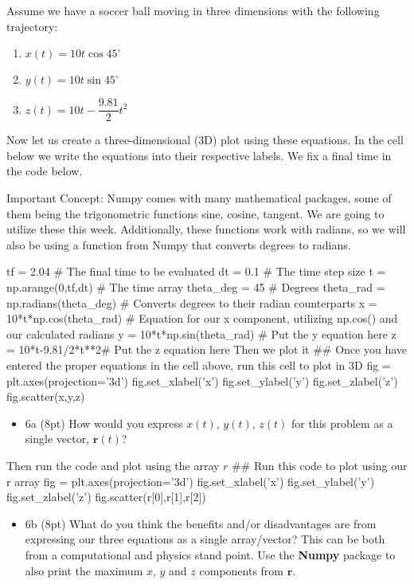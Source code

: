 \documentclass[%
oneside,                 %
final,                   %
10pt]{article}
\begin{document}
Assume we have a soccer ball moving in three dimensions with the following trajectory:

\begin{enumerate}
\item $x(t) = 10t\cos{45^{\circ}} $

\item $y(t) = 10t\sin{45^{\circ}} $

\item $z(t) = 10t - \dfrac{9.81}{2}t^2$
\end{enumerate}

\noindent
Now let us create a three-dimensional (3D) plot using these equations. In the cell below
we write the equations into their respective labels. We fix a final time in the code below.

Important Concept: Numpy comes with many mathematical packages, some
of them being the trigonometric functions sine, cosine, tangent. We
are going to utilize these this week. Additionally, these functions
work with radians, so we will also be using a function from Numpy that
converts degrees to radians.


\bpycod
tf = 2.04  # The final time to be evaluated
dt = 0.1  # The time step size
t = np.arange(0,tf,dt) # The time array
theta_deg = 45 # Degrees
theta_rad = np.radians(theta_deg) # Converts degrees to their radian counterparts
x = 10*t*np.cos(theta_rad) # Equation for our x component, utilizing np.cos() and our calculated radians
y = 10*t*np.sin(theta_rad) # Put the y equation here
z = 10*t-9.81/2*t**2# Put the z equation here
\epycod
Then we plot it
\bpycod
## Once you have entered the proper equations in the cell above, run this cell to plot in 3D
fig = plt.axes(projection='3d')
fig.set_xlabel('x')
fig.set_ylabel('y')
fig.set_zlabel('z')
fig.scatter(x,y,z)
\epycod

\begin{itemize}
\item 6a (8pt) How would you express $x(t)$, $y(t)$, $z(t)$ for this problem as a single vector, $\bm{r}(t)$?
\end{itemize}

\noindent
Then run the code and plot using the array $r$
\bpycod
## Run this code to plot using our r array 
fig = plt.axes(projection='3d')
fig.set_xlabel('x')
fig.set_ylabel('y')
fig.set_zlabel('z')
fig.scatter(r[0],r[1],r[2])
\epycod

\begin{itemize}
\item 6b (8pt) What do you think the benefits and/or disadvantages are from expressing our three equations as a single array/vector? This can be both from a computational and physics stand point. Use the \textbf{Numpy} package to also print the maximum $x$, $y$ and $z$ components from $\bm{r}$.
\end{itemize}
\end{document}
